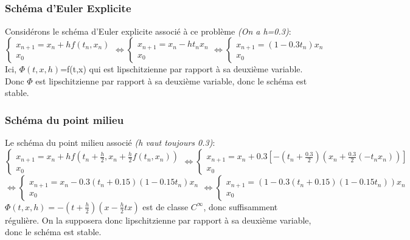 \documentclass[a4paper,12pt,landscape]{article}
\begin{document}
\subsection{}
\subsubsection{Schéma d'Euler Explicite}
Considérons le schéma d'Euler explicite associé à ce problème {\it (On a h=0.3)}:
$$\left \{
\begin{array}{l}
	x_{n+1}= x_n + h f(t_n,x_n)\\
	x_0 
\end{array}
\right.
\Leftrightarrow
\left \{
\begin{array}{l}
	x_{n+1}= x_n -ht_nx_n\\
	x_0
\end{array}
\right.
\Leftrightarrow
\left \{
\begin{array}{l}
	x_{n+1}= (1-0.3t_n)x_n\\
	x_0
\end{array}
\right.$$
Ici, $\Phi(t,x,h)$=f(t,x) qui est lipschitzienne par rapport à sa deuxième variable. Donc $\Phi$ est lipschitzienne par rapport à sa deuxième variable, donc le schéma est stable.\\

\subsubsection{Schéma du point milieu}
Le schéma du point milieu associé \textit{(h vaut toujours 0.3)}:\\
$$\left \{
\begin{array}{l}
	x_{n+1}= x_n + h f(t_n+\frac{h}{2},x_n+\frac{h}{2}f(t_n,x_n))\\
	x_0 
\end{array}
\right.
\Leftrightarrow
\left \{
\begin{array}{l}
	x_{n+1}= x_n +0.3\left[ -\left( t_n+\frac{0.3}{2}\right) \left( x_n+\frac{0.3}{2}(-t_nx_n)\right) \right]\\
	x_0
\end{array}
\right.$$
$$\Leftrightarrow
\left \{
\begin{array}{l}
	x_{n+1}= x_n-0.3(t_n+0.15)(1-0.15t_n)x_n\\
	x_0
\end{array}
\right.
\Leftrightarrow
\left \{
\begin{array}{l}
	x_{n+1}= (1-0.3(t_n+0.15)(1-0.15t_n))x_n\\
	x_0
\end{array}
\right.$$
$\Phi(t,x,h)=-(t+\frac{h}{2})(x-\frac{h}{2}tx)$ est de classe $C^\infty$, donc suffisamment régulière. On la supposera donc lipschitzienne par rapport à sa deuxième variable, donc le schéma est stable.
\end{document}
